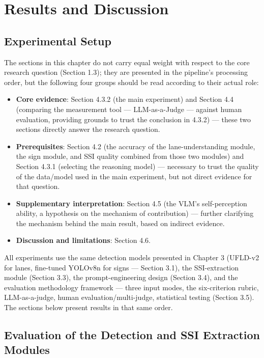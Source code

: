 \documentclass[12pt,a4paper]{report}
\begin{document}
\chapter{Results and Discussion}

\section{Experimental Setup}

The sections in this chapter do not carry equal weight with respect to the core research question (Section 1.3); they are presented in the pipeline's processing order, but the following four groups should be read according to their actual role:

\begin{itemize}
    \item \textbf{Core evidence}: Section 4.3.2 (the main experiment) and Section 4.4 (comparing the measurement tool --- LLM-as-a-Judge --- against human evaluation, providing grounds to trust the conclusion in 4.3.2) --- these two sections directly answer the research question.
    \item \textbf{Prerequisites}: Section 4.2 (the accuracy of the lane-understanding module, the sign module, and SSI quality combined from those two modules) and Section 4.3.1 (selecting the reasoning model) --- necessary to trust the quality of the data/model used in the main experiment, but not direct evidence for that question.
    \item \textbf{Supplementary interpretation}: Section 4.5 (the VLM's self-perception ability, a hypothesis on the mechanism of contribution) --- further clarifying the mechanism behind the main result, based on indirect evidence.
    \item \textbf{Discussion and limitations}: Section 4.6.
\end{itemize}

All experiments use the same detection models presented in Chapter 3 (UFLD-v2 for lanes, fine-tuned YOLOv8n for signs --- Section 3.1), the SSI-extraction module (Section 3.3), the prompt-engineering design (Section 3.4), and the evaluation methodology framework --- three input modes, the six-criterion rubric, LLM-as-a-judge, human evaluation/multi-judge, statistical testing (Section 3.5). The sections below present results in that same order.

\section{Evaluation of the Detection and SSI Extraction Modules}
\end{document}
